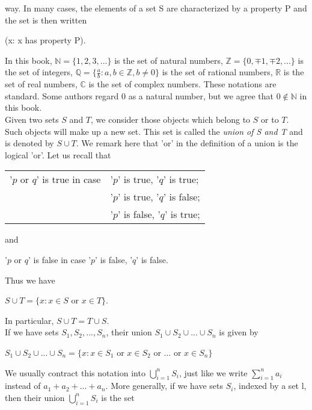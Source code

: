 \documentclass{article}
\begin{document}
    way. In many cases, the elements of a set S are characterized by a property P and the set is then written
    \begin{center}
        (x: x has property P).\\
    \end{center}
    In this book, $\mathbb{N}=\{1,2,3,...\}$ is the set of natural numbers, $\mathbb{Z}=\{0,\mp1,\mp2,...\}$ is the set of integers, $\mathbb{Q}=\{\frac{a}{b}:a,b \in \mathbb{Z}, b\ne 0\}$ is the set of rational numbers, $\mathbb{R}$ is the set of real numbers, $\mathbb{C}$ is the set of complex numbers. These notations are standard. Some authors regard 0 as a natural number, but we agree that $0 \notin \mathbb{N}$ in this book.\\
    
    \noindent Given two sets $S$ and $T$, we consider those objects which belong to $S$ or to $T$. Such objects will make up a new set. This set is called the \textit{union of S and T} and is denoted by $S \cup T$. We remark here that 'or' in the definition of a union is the logical 'or'. Let us recall that
    \begin{center}
        \begin{tabular}{ l l}
            '$p$ or $q$' is true in case & '$p$' is true, '$q$' is true; \\
            & '$p$' is true, '$q$' is false;\\
            & '$p$' is false, '$q$' is true;\\
        \end{tabular}
    \end{center}
    and
    \begin{center}
        '$p$ or $q$' is false in case '$p$' is false, '$q$' is false.
    \end{center}
    Thus we have
    \begin{center}
        $S \cup T = \{x: x \in S$ or $x \in T \}$.
    \end{center}
    In particular, $S \cup T = T \cup S$.\\
    If we have sets $S_{1},S_{2},...,S_{n}$, their union $S_{1} \cup S_{2} \cup ... \cup S_{n}$ is given by 
    \begin{center}
        $S_{1} \cup S_{2} \cup ... \cup S_{n} = \{x: x\in S_{1}$ or $x \in S_{2}$ or ... or $x \in S_{n} \}$
    \end{center}
    We usually contract this notation into $\bigcup\limits_{i=1}^{n} S_{i}$, just like we write $\sum\limits_{i=1}^{n} a_{i}$ instead of $a_{1}+a_{2}+...+a_{n}$. More generally, if we have sets $S_{i}$, indexed by a set l, then their union $\bigcup\limits_{i=1}^{n} S_{i}$ is the set
\end{document}
